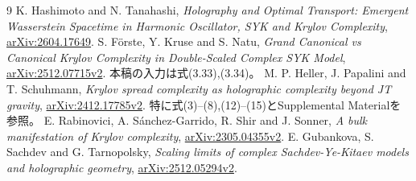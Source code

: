 \documentclass[a4paper,11pt]{ltjsarticle}
\numberwithin{equation}{section}
\begin{document}
\begin{thebibliography}{9}
K. Hashimoto and N. Tanahashi,
\emph{Holography and Optimal Transport: Emergent Wasserstein Spacetime in Harmonic Oscillator, SYK and Krylov Complexity},
\href{https://arxiv.org/abs/2604.17649}{arXiv:2604.17649}.
S. F\"orste, Y. Kruse and S. Natu,
\emph{Grand Canonical vs Canonical Krylov Complexity in Double-Scaled Complex SYK Model},
\href{https://arxiv.org/abs/2512.07715v2}{arXiv:2512.07715v2}.
本稿の入力は式(3.33),(3.34)。
M. P. Heller, J. Papalini and T. Schuhmann,
\emph{Krylov spread complexity as holographic complexity beyond JT gravity},
\href{https://arxiv.org/abs/2412.17785v2}{arXiv:2412.17785v2}.
特に式(3)--(8),(12)--(15)とSupplemental Materialを参照。
E. Rabinovici, A. S\'anchez-Garrido, R. Shir and J. Sonner,
\emph{A bulk manifestation of Krylov complexity},
\href{https://arxiv.org/abs/2305.04355v2}{arXiv:2305.04355v2}.
E. Gubankova, S. Sachdev and G. Tarnopolsky,
\emph{Scaling limits of complex Sachdev-Ye-Kitaev models and holographic geometry},
\href{https://arxiv.org/abs/2512.05294v2}{arXiv:2512.05294v2}.
\end{thebibliography}
\end{document}
